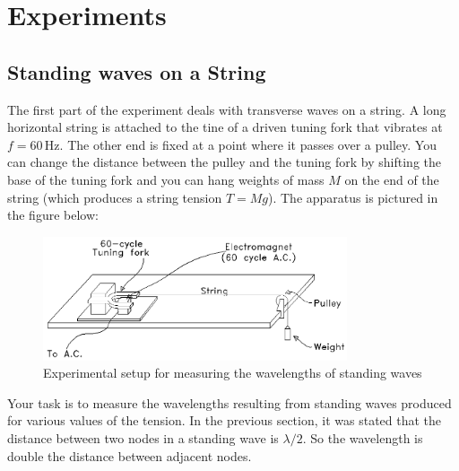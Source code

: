 \section{Experiments}
\subsection{Standing waves on a String}
The first part of the experiment deals with transverse waves on a string. A long horizontal string is attached to the tine of a driven tuning fork that vibrates at $f = 60\, \textrm{Hz}$. The other end is fixed at a point where it passes over a pulley. You can change the distance between the pulley and the tuning fork by shifting the base of the tuning fork and you can hang weights of mass $M$ on the end of the string (which produces a string tension $T=Mg$). The apparatus is pictured in the figure below:\myskip
\begin{figure}[h]
\centering
\includegraphics[width=0.8\textwidth]{./Exp1-9/pic/image4.png}
\caption{Experimental setup for measuring the wavelengths of standing waves}
\end{figure}

Your task is to measure the wavelengths resulting from standing waves produced for various values of the tension. In the previous section, it was stated that the distance between two nodes in a standing wave is $\lambda/2$. So the wavelength is double the distance between adjacent nodes.\myskip

